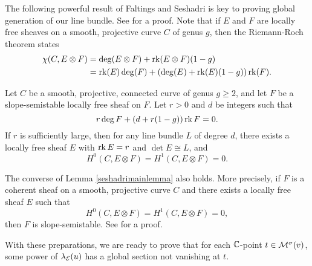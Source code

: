 The following powerful result of Faltings and Seshadri is key to proving global generation of our line bundle. See \cite[Lemma 3.1, Remark 3.2]{seshadri} for a proof. Note that if $E$ and $F$ are locally free sheaves on a smooth, projective curve $C$ of genus $g$, then the Riemann-Roch theorem states
\begin{align*} 
    \chi(C, E \otimes F) & = \deg(E \otimes F) + \operatorname{\mathrm{rk}}(E \otimes F)(1-g) \\ 
    & = \operatorname{\mathrm{rk}}(E) \deg(F) + (\deg(E) + \operatorname{\mathrm{rk}}(E)(1-g))\operatorname{\mathrm{rk}}(F).
\end{align*}
\begin{lem}\label{seshadrimainlemma}
    Let $C$ be a smooth, projective, connected curve of genus $g \ge 2$, and let $F$ be a slope-semistable locally free sheaf on $F$. Let $r >0$ and $d$ be integers such that
    \[ r \deg F + (d + r(1-g)) \operatorname{\mathrm{rk}} F = 0. \]
    If $r$ is sufficiently large, then for any line bundle $L$ of degree $d$, there exists a locally free sheaf $E$ with $\operatorname{\mathrm{rk}} E = r$ and $\det E \cong L$, and
    \[ H^0(C, E \otimes F) = H^1(C, E \otimes F) = 0. \]
\end{lem}

\begin{rmk}
    The converse of Lemma \ref{seshadrimainlemma} also holds. More precisely, if $F$ is a coherent sheaf on a smooth, projective curve $C$ and there exists a locally free sheaf $E$ such that
    \[ H^0(C, E \otimes F) = H^1(C, E \otimes F) = 0, \]
    then $F$ is slope-semistable. See \cite[Theorem 2.13]{MS} for a proof.
\end{rmk}

With these preparations, we are ready to prove that for each $\mathbb{C}$-point $t \in \mathcal{M}^\sigma(v)$, some power of $\lambda_{\mathcal{E}}(u)$ has a global section not vanishing at $t$. 

